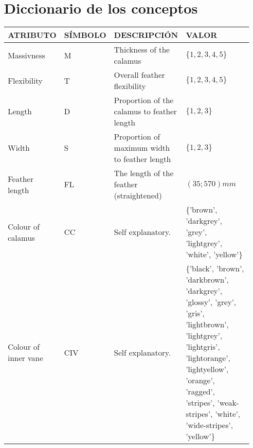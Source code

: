 \documentclass[a4paper,12pt]{article}
\begin{document}
\section{Diccionario de los conceptos}
\begin{table}[H]
	\centering
	\begin{tabular}{|p{0.2\linewidth}|p{0.15\linewidth}|p{0.25\linewidth}|p{0.45\linewidth}|}
		\hline
		ATRIBUTO                 & SÍMBOLO & DESCRIPCIÓN                                   & VALOR                                                                                                                                  \\ \hline\hline
		Massivness               & M       & Thickness of the calamus                      & $\{1,2,3,4,5\}$                                                                                                                        \\ \hline
		Flexibility              & T       & Overall feather flexibility                   & $\{1,2,3,4,5\}$                                                                                                                        \\ \hline
		Length                   & D       & Proportion of the calamus to feather length   & $\{1,2,3\}$                                                                                                                            \\ \hline
		Width                    & S       & Proportion of maximum width to feather length & $\{1,2,3\}$                                                                                                                            \\ \hline
		Feather length           & FL      & The length of the feather (straightened)      & $(35;570) mm$                                                                                                                          \\ \hline
		Colour of calamus        & CC      & Self explanatory.                             & \{'brown', 'darkgrey', 'grey', 'lightgrey', 'white', 'yellow'\}                                                                        \\ \hline
		Colour of inner vane     & CIV     & Self explanatory.                             & \{'black', 'brown', 'darkbrown', 'darkgrey', 'glossy', 'grey', 'gris', 'lightbrown', 'lightgrey', 'lightgris', 'lightorange', 'lightyellow', 'orange', 'ragged', 'stripes', 'weak-stripes', 'white', 'wide-stripes', 'yellow'\}                             \\ \hline

\end{tabular}
\end{table}
\end{document}
